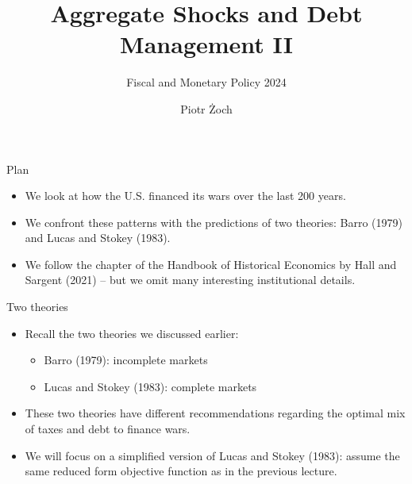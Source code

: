 \documentclass[11pt,xcolor={dvipsnames},aspectratio=159,hyperref={pdftex,pdfpagemode=UseNone,hidelinks,pdfdisplaydoctitle=true},usepdftitle=false]{beamer}
\begin{document}
\title{Aggregate Shocks and Debt Management II}
\subtitle{Fiscal and Monetary Policy 2024}

\author{Piotr Żoch}%
\frame{\titlepage}

\begin{frame}{Plan}
    \begin{itemize}
    \item We look at how the U.S. financed its wars over the last 200 years.
    \item We confront these patterns with the predictions of two theories: Barro (1979) and Lucas and Stokey (1983).
    \item We follow the chapter of the Handbook of Historical Economics by Hall and Sargent (2021) -- but we omit many interesting institutional details.
    \end{itemize}
\end{frame}



\begin{frame}
\end{frame}

\begin{frame}{Two theories}
\begin{itemize}
\item Recall the two theories we discussed earlier:
\begin{itemize}
\item Barro (1979): incomplete markets
\item Lucas and Stokey (1983): complete markets
\end{itemize}
\item These two theories have different recommendations regarding the optimal mix of taxes and debt to finance wars.
\item We will focus on a simplified version of Lucas and Stokey (1983): assume the same reduced form objective function as in the previous lecture.  
\end{itemize}
\end{frame}
\end{document}
